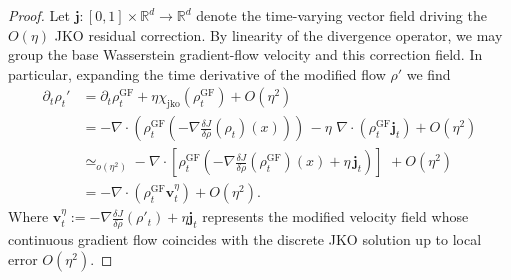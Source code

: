 \documentclass[reqno,11pt,letterpaper]{amsart}
\theoremstyle{plain}
\theoremstyle{definition}
\theoremstyle{remark}
\newcommand{\mb}{\mathbf}
\newcommand{\wass}{\mathrm{GF}}
\newcommand{\wagrad}{\nabla \frac{\delta J}{\delta \rho}}
\newcommand{\jkoreg}{\chi_{\mathrm{jko}}}
\begin{document}
\begin{proof}
Let $\bm{j} : [0,1] \times \mathbb{R}^{d} \to \mathbb{R}^{d}$ denote the time-varying vector field driving the $O(\eta)$ JKO residual correction. By linearity of the divergence operator, we may group the base Wasserstein gradient-flow velocity and this correction field. In particular, expanding the time derivative of the modified flow $\rho'$ we find
\begin{align*}
\partial_{t} \rho_{t}' &= \partial_{t} \rho^{\wass}_{t} + \eta \jkoreg(\rho_{t}^{\wass}) + O(\eta^{2})\\
&= -\nabla \cdot \left(\rho_{t}^{\wass} \left( -\wagrad (\rho_{t})(x) \right)
\right)\, - 
\eta \,\, \nabla \cdot ( 
\rho_{t}^{\wass} \bm{j}_{t} ) + O(\eta^{2})
\\
&\simeq_{o(\eta^{2})} - \nabla \cdot \left[\rho^{\wass}_{t} \left( -\wagrad (\rho_{t}^{\wass})(x) + \eta \, \bm{j}_{t} 
\right) \right]\,\, + O(\eta^{2}) \\
&=  - \nabla \cdot \left(\rho^{\wass}_{t} \mb{v}^{\eta}_{t} \right) + O(\eta^{2}).
\end{align*}
Where $\mathbf{v}^{\eta}_{t} := -\wagrad (\rho'_{t}) + \eta \bm{j}_{t}$ represents the modified velocity field whose continuous gradient flow coincides with the discrete JKO solution up to local error $O(\eta^2)$. 


\end{proof}
\end{document}
